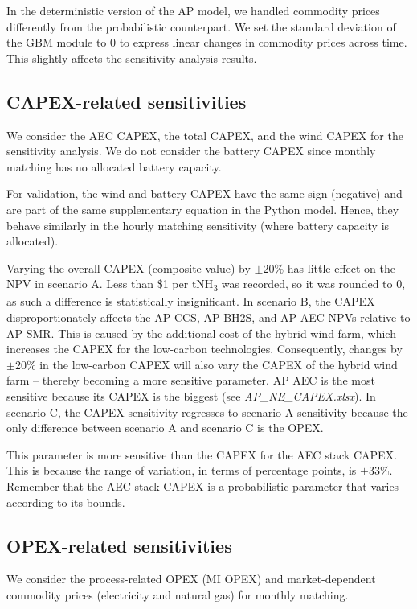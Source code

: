\documentclass{article}
\begin{document}
In the deterministic version of the AP model, we handled commodity prices differently from the probabilistic counterpart. We set the standard deviation of the GBM module to 0 to express linear changes in commodity prices across time. This slightly affects the sensitivity analysis results.

\subsection{CAPEX-related sensitivities}

We consider the AEC CAPEX, the total CAPEX, and the wind CAPEX for the sensitivity analysis. We do not consider the battery CAPEX since monthly matching has no allocated battery capacity.

For validation, the wind and battery CAPEX have the same sign (negative) and are part of the same supplementary equation in the Python model. Hence, they behave similarly in the hourly matching sensitivity (where battery capacity is allocated).

Varying the overall CAPEX (composite value) by $\pm$20\% has little effect on the NPV in scenario A. Less than \$1 per tNH\textsubscript{3} was recorded, so it was rounded to 0, as such a difference is statistically insignificant. In scenario B, the CAPEX disproportionately affects the AP CCS, AP BH2S, and AP AEC NPVs relative to AP SMR. This is caused by the additional cost of the hybrid wind farm, which increases the CAPEX for the low-carbon technologies. Consequently, changes by $\pm$20\% in the low-carbon CAPEX will also vary the CAPEX of the hybrid wind farm – thereby becoming a more sensitive parameter. AP AEC is the most sensitive because its CAPEX is the biggest (see \textit{AP\_NE\_CAPEX.xlsx}). In scenario C, the CAPEX sensitivity regresses to scenario A sensitivity because the only difference between scenario A and scenario C is the OPEX.

This parameter is more sensitive than the CAPEX for the AEC stack CAPEX. This is because the range of variation, in terms of percentage points, is $\pm$33\%. Remember that the AEC stack CAPEX is a probabilistic parameter that varies according to its bounds.

\subsection{OPEX-related sensitivities}

We consider the process-related OPEX (MI OPEX) and market-dependent commodity prices (electricity and natural gas) for monthly matching.
\end{document}
